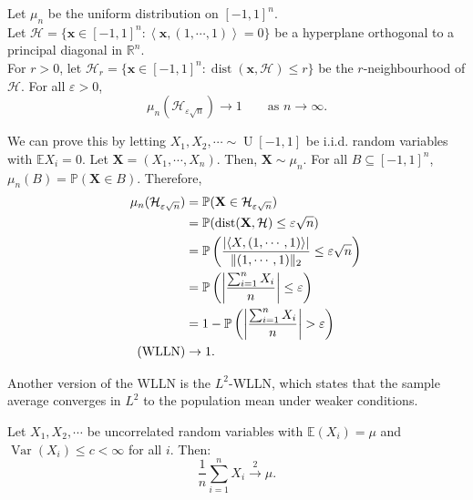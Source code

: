 \documentclass{huhtakm-template-book-v2}
\newcommand{\prob}{\mathbb{P}}
\newcommand{\expect}{\mathbb{E}}
\DeclareMathOperator{\U}{U}
\DeclareMathOperator{\Var}{Var}
\DeclareMathOperator{\dist}{dist}
\begin{document}
    \newpage

    \begin{eg}
        Let $\mu_{n}$ be the uniform distribution on $[-1,1]^{n}$.\\
        Let $\mathcal{H} = \{\mathbf{x} \in [-1,1]^{n}:\left < \mathbf{x},(1,\cdots,1)\right > = 0\}$ be a hyperplane orthogonal to a principal diagonal in $\mathbb{R}^{n}$.\\
        For $r > 0$, let $\mathcal{H}_{r} = \{\mathbf{x} \in [-1,1]^{n}:\dist(\mathbf{x},\mathcal{H}) \leq r\}$ be the $r$-neighbourhood of $\mathcal{H}$. For all $\varepsilon > 0$,
        \begin{equation*}
            \mu_{n}(\mathcal{H}_{\varepsilon\sqrt{n}}) \to 1 \qquad\text{as } n \to \infty.
        \end{equation*}
    \end{eg}
    \begin{proofing}
        We can prove this by letting $X_{1},X_{2},\cdots \sim \U[-1,1]$ be i.i.d. random variables with $\expect{X_{i}} = 0$. 
        Let $\mathbf{X} = (X_{1},\cdots,X_{n})$. Then, $\mathbf{X} \sim \mu_{n}$. 
        For all $B\subseteq[-1,1]^{n}$, $\mu_{n}(B) = \prob(\mathbf{X} \in B)$.
        Therefore,
        \begin{align*}
            \mu_{n}(\mathcal{H}_{\varepsilon\sqrt{n}}) &= \prob(\mathbf{X} \in \mathcal{H}_{\varepsilon\sqrt{n}})\\
            &= \prob(\dist(\mathbf{X},\mathcal{H}) \leq \varepsilon\sqrt{n})\\
            &= \prob\left(\frac{\abs{\left < X,(1,\cdots,1)\right > }}{\norm{(1,\cdots,1)}_{2}} \leq \varepsilon\sqrt{n}\right)\\
            &= \prob\left(\abs{\frac{\sum_{i = 1}^{n}X_{i}}{n}} \leq \varepsilon\right)\\
            &= 1-\prob\left(\abs{\frac{\sum_{i = 1}^{n}X_{i}}{n}} > \varepsilon\right)\\
            \tag{WLLN}
            &\to 1.
        \end{align*}
    \end{proofing}
    Another version of the WLLN is the $L^{2}$-WLLN, which states that the sample average converges in $L^{2}$ to the population mean under weaker conditions.
    \begin{thm}
        Let $X_{1},X_{2},\cdots$ be uncorrelated random variables with $\expect(X_{i}) = \mu$ and $\Var(X_{i}) \leq c < \infty$ for all $i$. Then:
        \begin{equation*}
            \frac{1}{n}\sum_{i = 1}^{n}X_{i} \xrightarrow{2} \mu.
        \end{equation*}
    \end{thm}
\end{document}
